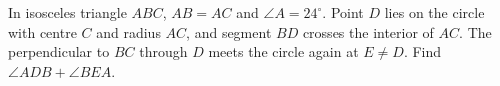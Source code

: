In isosceles triangle $ABC$, $AB=AC$ and $\angle A=24^\circ$. Point $D$ lies on the circle with centre $C$ and radius $AC$, and segment $BD$ crosses the interior of $AC$. The perpendicular to $BC$ through $D$ meets the circle again at $E\ne D$. Find $\angle ADB+\angle BEA$.
